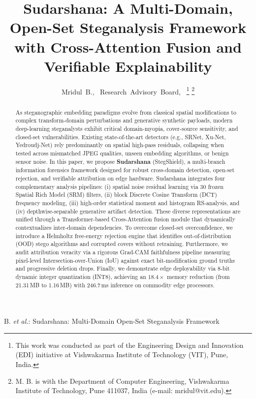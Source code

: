 \documentclass[journal]{IEEEtran}
\begin{document}
\title{Sudarshana: A Multi-Domain, Open-Set Steganalysis Framework with Cross-Attention Fusion and Verifiable Explainability}

\author{Mridul~B.,~
        Research~Advisory~Board,~
\thanks{This work was conducted as part of the Engineering Design and Innovation (EDI) initiative at Vishwakarma Institute of Technology (VIT), Pune, India.}
\thanks{M. B. is with the Department of Computer Engineering, Vishwakarma Institute of Technology, Pune 411037, India (e-mail: mridul@vit.edu).}}

%
{B. \MakeLowercase{\textit{et al.}}: Sudarshana: Multi-Domain Open-Set Steganalysis Framework}

\maketitle

\begin{abstract}
As steganographic embedding paradigms evolve from classical spatial modifications to complex transform-domain perturbations and generative synthetic payloads, modern deep-learning steganalysts exhibit critical domain-myopia, cover-source sensitivity, and closed-set vulnerabilities. Existing state-of-the-art detectors (e.g., SRNet, Xu-Net, Yedroudj-Net) rely predominantly on spatial high-pass residuals, collapsing when tested across mismatched JPEG qualities, unseen embedding algorithms, or benign sensor noise. In this paper, we propose \textbf{Sudarshana} (StegShield), a multi-branch information forensics framework designed for robust cross-domain detection, open-set rejection, and verifiable attribution on edge hardware. Sudarshana integrates four complementary analysis pipelines: (i) spatial noise residual learning via 30 frozen Spatial Rich Model (SRM) filters, (ii) block Discrete Cosine Transform (DCT) frequency modeling, (iii) high-order statistical moment and histogram RS-analysis, and (iv) depthwise-separable generative artifact detection. These diverse representations are unified through a Transformer-based Cross-Attention fusion module that dynamically contextualizes inter-domain dependencies. To overcome closed-set overconfidence, we introduce a Helmholtz free-energy rejection engine that identifies out-of-distribution (OOD) stego algorithms and corrupted covers without retraining. Furthermore, we audit attribution veracity via a rigorous Grad-CAM faithfulness pipeline measuring pixel-level Intersection-over-Union (IoU) against exact bit-modification ground truths and progressive deletion drops. Finally, we demonstrate edge deployability via 8-bit dynamic integer quantization (INT8), achieving an $18.4\times$ memory reduction (from 21.31\,MB to 1.16\,MB) with 246.7\,ms inference on commodity edge processors.
\end{abstract}
\end{document}

